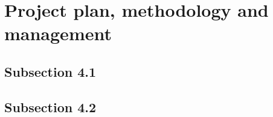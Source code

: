\section{Project plan, methodology and management}
\label{sec:results}
\subsection{Subsection 4.1}

\subsection{Subsection 4.2}




\FloatBarrier %
